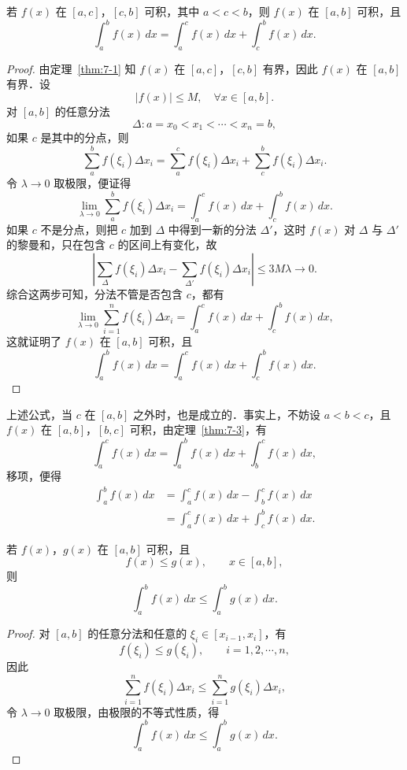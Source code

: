 \begin{theorem}[定积分的可加性]\label{thm:7-3}
若 $f(x)$ 在 $[a,c]$，$[c,b]$ 可积，其中 $a < c < b$，则 $f(x)$ 在 $[a,b]$ 可积，且
\[
\int_a^b f(x)\,dx = \int_a^c f(x)\,dx + \int_c^b f(x)\,dx.
\]
\end{theorem}

\begin{proof}
由定理~\ref{thm:7-1} 知 $f(x)$ 在 $[a,c]$，$[c,b]$ 有界，因此 $f(x)$ 在 $[a,b]$ 有界．设
\[
|f(x)| \leqslant M, \quad \forall x \in [a,b].
\]
对 $[a,b]$ 的任意分法
\[
\Delta: a = x_0 < x_1 < \cdots < x_n = b,
\]
如果 $c$ 是其中的分点，则
\[
\sum_a^b f(\xi_i)\Delta x_i = \sum_a^c f(\xi_i)\Delta x_i + \sum_c^b f(\xi_i)\Delta x_i.
\]
令 $\lambda \to 0$ 取极限，便证得
\[
\lim_{\lambda \to 0}\sum_a^b f(\xi_i)\Delta x_i = \int_a^c f(x)\,dx + \int_c^b f(x)\,dx.
\]
如果 $c$ 不是分点，则把 $c$ 加到 $\Delta$ 中得到一新的分法 $\Delta'$，这时 $f(x)$ 对 $\Delta$ 与 $\Delta'$ 的黎曼和，只在包含 $c$ 的区间上有变化，故
\[
\left|\sum_\Delta f(\xi_i)\Delta x_i - \sum_{\Delta'} f(\xi_i)\Delta x_i\right| \leqslant 3M\lambda \to 0.
\]
综合这两步可知，分法不管是否包含 $c$，都有
\[
\lim_{\lambda \to 0}\sum_{i=1}^n f(\xi_i)\Delta x_i = \int_a^c f(x)\,dx + \int_c^b f(x)\,dx,
\]
这就证明了 $f(x)$ 在 $[a,b]$ 可积，且
\[
\int_a^b f(x)\,dx = \int_a^c f(x)\,dx + \int_c^b f(x)\,dx.
\]
\end{proof}

上述公式，当 $c$ 在 $[a,b]$ 之外时，也是成立的．事实上，不妨设 $a < b < c$，且 $f(x)$ 在 $[a,b]$，$[b,c]$ 可积，由定理~\ref{thm:7-3}，有
\[
\int_a^c f(x)\,dx = \int_a^b f(x)\,dx + \int_b^c f(x)\,dx,
\]
移项，便得
\begin{align*}
\int_a^b f(x)\,dx &= \int_a^c f(x)\,dx - \int_b^c f(x)\,dx \\
&= \int_a^c f(x)\,dx + \int_c^b f(x)\,dx.
\end{align*}

\begin{theorem}[积分单调性]\label{thm:7-4}
若 $f(x)$，$g(x)$ 在 $[a,b]$ 可积，且
\[
f(x) \leqslant g(x), \qquad x \in [a,b],
\]
则
\[
\int_a^b f(x)\,dx \leqslant \int_a^b g(x)\,dx.
\]
\end{theorem}

\begin{proof}
对 $[a,b]$ 的任意分法和任意的 $\xi_i \in [x_{i-1}, x_i]$，有
\[
f(\xi_i) \leqslant g(\xi_i), \qquad i = 1, 2, \cdots, n,
\]
因此
\[
\sum_{i=1}^n f(\xi_i)\Delta x_i \leqslant \sum_{i=1}^n g(\xi_i)\Delta x_i,
\]
令 $\lambda \to 0$ 取极限，由极限的不等式性质，得
\[
\int_a^b f(x)\,dx \leqslant \int_a^b g(x)\,dx.
\]
\end{proof}

